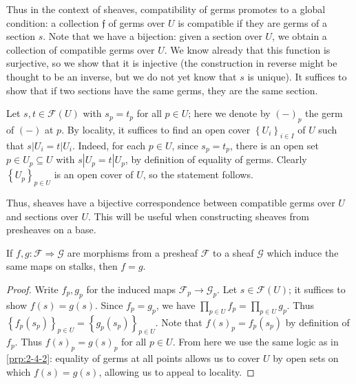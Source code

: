 \begin{remark}\label{rmk:2-4-3}
	Thus in the context of sheaves, compatibility of germs promotes to a global condition: a collection $\mathfrak{f} $ of germs over $U$ is compatible if they are germs of a section $s$. Note that we have a bijection: given a section over $U$, we obtain a collection of compatible germs over $U$. We know already that this function is surjective, so we show that it is injective (the construction in reverse might be thought to be an inverse, but we do not yet know that $s$ is unique). It suffices to show that if two sections have the same germs, they are the same section.

	Let $s,t\in \mathcal{F} (U)$ with $s_p=t_p$ for all $p\in U$; here we denote by $(-)_p$ the germ of $(-)$ at $p$. By locality, it suffices to find an open cover $\left\{ U_i \right\}_{i\in I} $ of $U$ such that $s|U_i=t|U_i$. Indeed, for each $p\in U$, since $s_p=t_p$, there is an open set $p\in U_p \subseteq U$ with $s|U_p=t|U_p$, by definition of equality of germs. Clearly $\left\{ U_p \right\}_{p\in U} $ is an open cover of $U$, so the statement follows.
	
	Thus, sheaves have a bijective correspondence between compatible germs over $U$ and sections over $U$. This will be useful when constructing sheaves from presheaves on a base.
\end{remark}

\begin{exercise}\label{ex:2-4-4}
	If $f,g  : \mathcal{F}  \Rightarrow \mathcal{G} $ are morphisms from a presheaf $\mathcal{F} $ to a sheaf $\mathcal{G} $ which induce the same maps on stalks, then $f=g$.
\end{exercise}
\begin{proof}
	Write $f_p,g_p$ for the induced maps $\mathcal{F} _p\to \mathcal{G} _p$. Let $s\in \mathcal{F} (U)$; it suffices to show $f(s)=g(s)$. Since $f_p=g_p$, we have $\prod_{p\in U} f_p=\prod_{p\in U} g_p$. Thus $\left\{ f_p(s_p) \right\}_{p\in U} =\left\{ g_p(s_p) \right\} _{p\in U} $. Note that $f(s)_p = f_p(s_p)$ by definition of $f_p$. Thus $f(s)_p=g(s)_p$ for all $p\in U$. From here we use the same logic as in \cref{prp:2-4-2}: equality of germs at all points allows us to cover $U$ by open sets on which $f(s)=g(s)$, allowing us to appeal to locality.
\end{proof}

